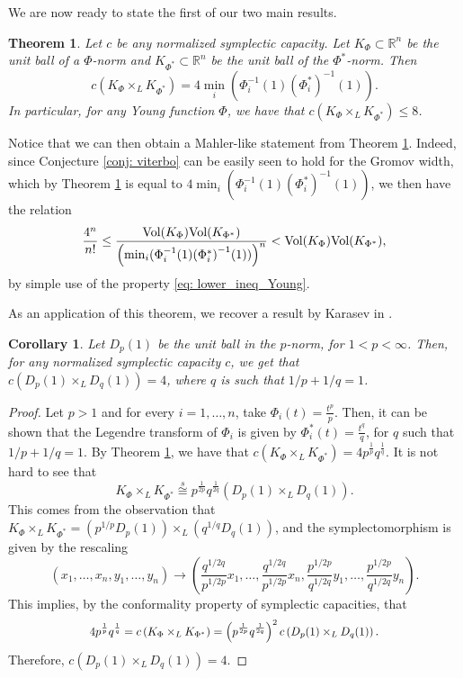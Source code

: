 \documentclass{article}
\newtheorem{theorem}{Theorem}[section]
\newtheorem{cor}{Corollary}[theorem]
\theoremstyle{definition}
\begin{document}
We are now ready to state the first of our two main results. 

\begin{theorem}\label{thm: capacity}
Let $c$ be any normalized symplectic capacity. Let $K_{\Phi}\subset \mathbb{R}^n$ be the unit ball of a $\Phi$-norm and $K_{\Phi^*}\subset \mathbb{R}^n$ be the unit ball of the $\Phi^*$-norm. Then
$$c(K_{\Phi}\times_L K_{\Phi^*})=4\min_i(\Phi_i^{-1}(1){(\Phi^*_i)}^{-1}(1)).$$
In particular, for any Young function $\Phi$, we have that $c(K_{\Phi}\times_L K_{\Phi^*})\leq 8$.
\end{theorem}

Notice that we can then obtain a Mahler-like statement from Theorem \ref{thm: capacity}. Indeed, since Conjecture \ref{conj: viterbo} can be easily seen to hold for the Gromov width, which by Theorem \ref{thm: capacity} is equal to $4\min_i(\Phi_i^{-1}(1){(\Phi^*_i)}^{-1}(1))$, we then have the relation
$$\frac{4^n}{n!}\leq \frac{\textup{Vol}(K_{\Phi})\textup{Vol}(K_{\Phi^*})}{\left(\min_i(\Phi_i^{-1}(1){(\Phi^*_i)}^{-1}(1))\right)^n}<\textup{Vol}(K_{\Phi})\textup{Vol}(K_{\Phi^*}),$$
by simple use of the property \eqref{eq: lower_ineq_Young}.

As an application of this theorem, we recover a result by Karasev in \cite{Karasev2019MahlersCF}.


\begin{cor}
Let $D_p(1)$ be the unit ball in the $p$-norm, for $1<p<\infty$. Then, for any normalized symplectic capacity $c$, we get that $c(D_p(1)\times_L D_q(1))=4$, where $q$ is such that $1/p+1/q=1$.
\end{cor}
\begin{proof}
Let $p>1$ and for every $i=1,\ldots,n$, take $\Phi_i(t)=\frac{t^p}{p}$. Then, it can be shown that the Legendre transform of $\Phi_i$ is given by $\Phi^*_i(t)=\frac{t^q}{q}$, for $q$ such that $1/p+1/q=1$. By Theorem \ref{thm: capacity}, we have that $c(K_{\Phi}\times_L K_{\Phi^*})=4p^{\frac{1}{p}}q^{\frac{1}{q}}$. It is not hard to see that 
$$K_{\Phi}\times_L K_{\Phi^*}\overset{s}{\cong}p^{\frac{1}{2p}}q^{\frac{1}{2q}}(D_p(1)\times_L D_q(1)).$$
This comes from the observation that $K_{\Phi}\times_L K_{\Phi^*}= \left(p^{1/p}D_p(1)\right)\times_L \left(q^{1/q}D_q(1)\right)$, and the symplectomorphism is given by the rescaling 
$$(x_1,\ldots,x_n,y_1,\ldots,y_n) \to \left(\frac{q^{1/2q}}{p^{1/2p}}x_1,\ldots,\frac{q^{1/2q}}{p^{1/2p}}x_n,\frac{p^{1/2p}}{q^{1/2q}}y_1,\ldots,\frac{p^{1/2p}}{q^{1/2q}}y_n\right).$$
This implies, by the conformality property of symplectic capacities, that 
\[
\scalebox{0.9}{$
4p^{\frac{1}{p}}q^{\frac{1}{q}}=c\left(K_{\Phi}\times_L K_{\Phi^*}\right)=\left(p^{\frac{1}{2p}}q^{\frac{1}{2q}}\right)^2c\left(D_p(1)\times_L D_q(1)\right).
$}
\]
Therefore, $c\left(D_p(1)\times_L D_q(1)\right)= 4$.
\end{proof}
\end{document}
